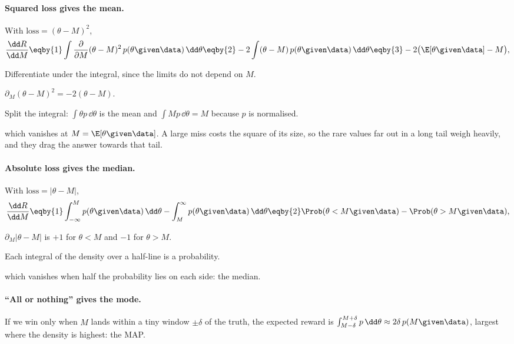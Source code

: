 \paragraph{Squared loss gives the mean.}
With $\mathrm{loss}=(\theta-M)^2$,
\begin{align*}
  \frac{\dd R}{\dd M}
  \eqby{1}\int\frac{\partial}{\partial M}(\theta-M)^2\,p(\theta\given\data)\,\dd\theta
  \eqby{2}-2\int(\theta-M)\,p(\theta\given\data)\,\dd\theta
  \eqby{3}-2\bigl(\E[\theta\given\data]-M\bigr),
\end{align*}
\begin{explain}
  \item Differentiate under the integral, since the limits do not depend on $M$.
  \item $\partial_M(\theta-M)^2=-2(\theta-M)$.
  \item Split the integral: $\int\theta p\,\dd\theta$ is the mean and $\int Mp\,\dd\theta
        =M$ because $p$ is normalised.
\end{explain}
which vanishes at $M=\E[\theta\given\data]$. A large miss costs the square of its size,
so the rare values far out in a long tail weigh heavily, and they drag the answer
towards that tail.

\paragraph{Absolute loss gives the median.}
With $\mathrm{loss}=|\theta-M|$,
\begin{align*}
  \frac{\dd R}{\dd M}
  \eqby{1}\int_{-\infty}^{M}p(\theta\given\data)\,\dd\theta
         -\int_{M}^{\infty}p(\theta\given\data)\,\dd\theta
  \eqby{2}\Prob(\theta<M\given\data)-\Prob(\theta>M\given\data),
\end{align*}
\begin{explain}
  \item $\partial_M|\theta-M|$ is $+1$ for $\theta<M$ and $-1$ for $\theta>M$.
  \item Each integral of the density over a half-line is a probability.
\end{explain}
which vanishes when half the probability lies on each side: the median.

\paragraph{``All or nothing'' gives the mode.}
If we win only when $M$ lands within a tiny window $\pm\delta$ of the truth, the
expected reward is $\int_{M-\delta}^{M+\delta}p\,\dd\theta\approx2\delta\,p(M\given
\data)$, largest where the density is highest: the MAP.

